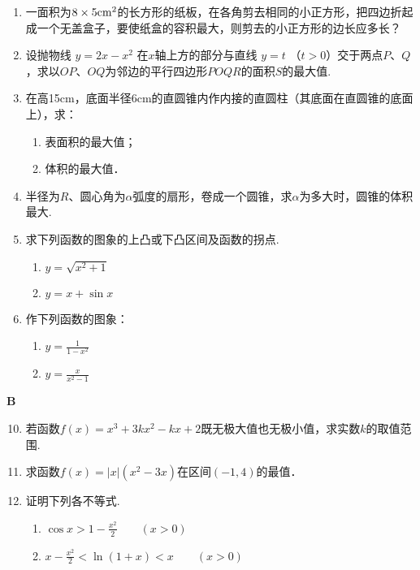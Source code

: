 \begin{enumerate}
\item 一面积为$8\times 5{\rm cm}^{2}$的长方形的纸板，在各角剪去相同的小正方形，把四边折起成一个无盖盒子，要使纸盒的容积最大，则剪去的小正方形的边长应多长？
\item 设抛物线 $y=2x-x^2$ 在$x$轴上方的部分与直线 $y=t$
（$t>0$）交于两点$P$、$Q$，求以$OP$、$OQ$为邻边的平行四边形$POQR$的面积$S$的最大值.
\item 在高15cm，底面半径6cm的直圆锥内作内接的直圆柱（其底面在直圆锥的底面上），求：
\begin{multicols}{2}
\begin{enumerate}[(1)]
    \item 表面积的最大值；
    \item 体积的最大值．
\end{enumerate}
\end{multicols}
\item 半径为$R$、圆心角为$\alpha$弧度的扇形，卷成一个圆锥，求$\alpha$为多大时，圆锥的体积最大.
\item 求下列函数的图象的上凸或下凸区间及函数的拐点.
\begin{multicols}{2}
    \begin{enumerate}[(1)]
        \item $y=\sqrt{x^2+1}$
        \item $y=x+\sin x$
    \end{enumerate}
\end{multicols}

\item 作下列函数的图象：
\begin{multicols}{2}
    \begin{enumerate}[(1)]
        \item $y=\frac{1}{1-x^2}$
        \item $y=\frac{x}{x^2-1}$
    \end{enumerate}
\end{multicols}
\end{enumerate}

\begin{center}
    \bfseries B
\end{center}

\begin{enumerate}\setcounter{enumi}{9}
    \item 若函数$f(x)=x^3+3kx^2-kx+2$既无极大值也无极小值，求实数$k$的取值范围.
    \item   求函数$f(x)=|x|(x^2-3x)$在区间$(-1,4)$的最值．
    \item   证明下列各不等式.
\begin{enumerate}[(1)]
    \item $\cos x>1-\frac{x^2}{2}\qquad (x>0)$
    \item $x-\frac{x^2}{2}<\ln(1+x)<x\qquad (x>0)$
\end{enumerate}
\end{enumerate}

